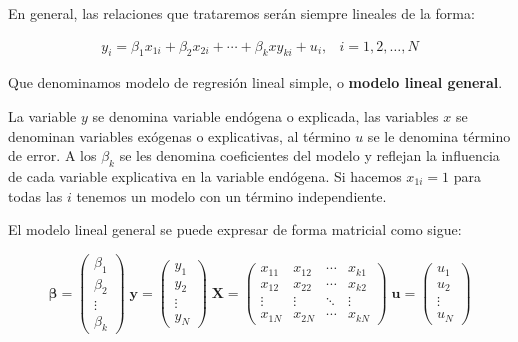En general, las relaciones que trataremos ser\'an siempre lineales de
la forma: 

\begin{equation*}
\begin{array}{cc}
y_{i}=\beta_{1}x_{1i}+\beta_{2}x_{2i}+\cdots+\beta_{k}xy_{ki}+u_{i}, & i=1,2,\ldots,N\end{array}
\end{equation*}


Que denominamos modelo de regresi\'on lineal simple, o \textbf{modelo
lineal general}.

La variable $y$ se denomina variable end\'ogena o explicada, las variables
$x$ se denominan variables ex\'ogenas o explicativas, al t\'ermino $u$
se le denomina t\'ermino de error. A los $\beta_{k}$ se les denomina
coeficientes del modelo y reflejan la influencia de cada variable
explicativa en la variable end\'ogena. Si hacemos $x_{1i}=1$ para todas
las $i$ tenemos un modelo con un t\'ermino independiente.



El modelo lineal general se puede expresar de forma matricial como
sigue:

\begin{equation*}
\boldsymbol{\beta}=\left(\begin{array}{c}
\beta_{1}\\
\beta_{2}\\
\vdots\\
\beta_{k}
\end{array}\right)\;\boldsymbol{y}=\left(\begin{array}{c}
y_{1}\\
y_{2}\\
\vdots\\
y_{N}
\end{array}\right)\;\boldsymbol{X}=\left(\begin{array}{cccc}
x_{11} & x_{12} & \cdots & x_{k1}\\
x_{12} & x_{22} & \cdots & x_{k2}\\
\vdots & \vdots & \ddots & \vdots\\
x_{1N} & x_{2N} & \cdots & x_{kN}
\end{array}\right)\;\boldsymbol{u}=\left(\begin{array}{c}
u_{1}\\
u_{2}\\
\vdots\\
u_{N}
\end{array}\right)
\end{equation*}


